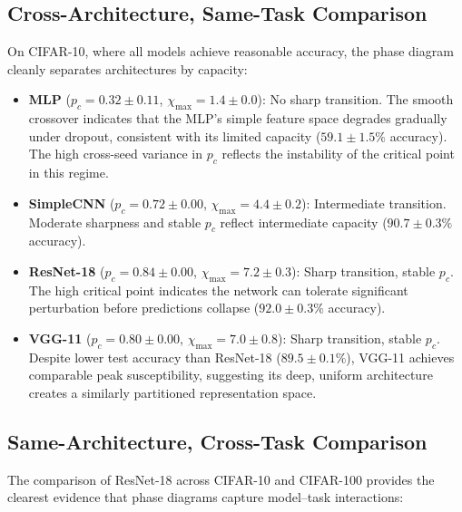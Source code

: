 \documentclass{article}
\begin{document}
\subsection{Cross-Architecture, Same-Task Comparison}

On CIFAR-10, where all models achieve reasonable accuracy, the phase diagram cleanly separates architectures by capacity:

\begin{itemize}
    \item \textbf{MLP} ($p_c = 0.32 \pm 0.11$, $\chi_{\max} = 1.4 \pm 0.0$): No sharp transition. The smooth crossover indicates that the MLP's simple feature space degrades gradually under dropout, consistent with its limited capacity ($59.1 \pm 1.5\%$ accuracy). The high cross-seed variance in $p_c$ reflects the instability of the critical point in this regime.
    \item \textbf{SimpleCNN} ($p_c = 0.72 \pm 0.00$, $\chi_{\max} = 4.4 \pm 0.2$): Intermediate transition. Moderate sharpness and stable $p_c$ reflect intermediate capacity ($90.7 \pm 0.3\%$ accuracy).
    \item \textbf{ResNet-18} ($p_c = 0.84 \pm 0.00$, $\chi_{\max} = 7.2 \pm 0.3$): Sharp transition, stable $p_c$. The high critical point indicates the network can tolerate significant perturbation before predictions collapse ($92.0 \pm 0.3\%$ accuracy).
    \item \textbf{VGG-11} ($p_c = 0.80 \pm 0.00$, $\chi_{\max} = 7.0 \pm 0.8$): Sharp transition, stable $p_c$. Despite lower test accuracy than ResNet-18 ($89.5 \pm 0.1\%$), VGG-11 achieves comparable peak susceptibility, suggesting its deep, uniform architecture creates a similarly partitioned representation space.
\end{itemize}

\subsection{Same-Architecture, Cross-Task Comparison}

The comparison of ResNet-18 across CIFAR-10 and CIFAR-100 provides the clearest evidence that phase diagrams capture model--task interactions:
\end{document}
